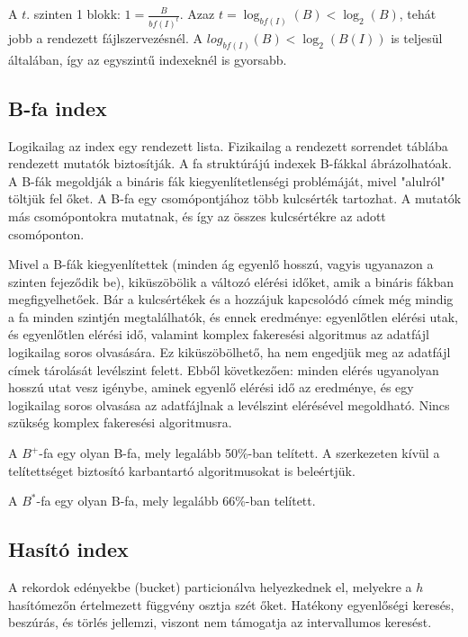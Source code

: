 \documentclass[margin=0px]{article}
\begin{document}
	A $t$. szinten 1 blokk: $1=\frac{B}{bf(I)^{t}}$. Azaz $t=\log_{bf(I)}(B) < \log_{2}(B) $, tehát jobb a rendezett fájlszervezésnél. A 
	$log_{bf(I)}(B) < \log_{2}(B(I)) $ is teljesül általában, így az egyszintű indexeknél is
	gyorsabb.
	
	\subsection{B-fa index}
	
	Logikailag az index egy rendezett lista. Fizikailag a rendezett sorrendet táblába rendezett mutatók 
	biztosítják. A fa struktúrájú indexek B-fákkal ábrázolhatóak. A B-fák megoldják a bináris fák 
	kiegyenlítetlenségi problémáját, mivel "alulról" töltjük fel őket. A B-fa egy csomópontjához több 
	kulcsérték tartozhat. A mutatók más csomópontokra mutatnak, és így az összes kulcsértékre az adott 
	csomóponton.
	
	Mivel a B-fák kiegyenlítettek (minden ág egyenlő hosszú, vagyis ugyanazon a szinten fejeződik be), 
	kiküszöbölik a változó elérési időket, amik a bináris fákban megfigyelhetőek. Bár a kulcsértékek és a 
	hozzájuk kapcsolódó címek még mindig a fa minden szintjén megtalálhatók, és ennek eredménye:
	egyenlőtlen elérési utak, és egyenlőtlen elérési idő, valamint komplex fakeresési algoritmus az 
	adatfájl logikailag soros olvasására. Ez kiküszöbölhető, ha nem engedjük meg az adatfájl címek 
	tárolását levélszint felett. Ebből következően: minden elérés ugyanolyan hosszú utat vesz igénybe, 
	aminek egyenlő elérési idő az eredménye, és egy logikailag soros olvasása az adatfájlnak a levélszint 
	elérésével megoldható. Nincs szükség komplex fakeresési algoritmusra.
	
	A $B^{+}$-fa egy olyan B-fa, mely legalább 50\%-ban telített. A szerkezeten kívül a telítettséget biztosító 
	karbantartó algoritmusokat is beleértjük.
	
	A $B^{*}$-fa egy olyan B-fa, mely legalább 66\%-ban telített.
	
	\subsection{Hasító index}
	
	A rekordok edényekbe (bucket) particionálva helyezkednek el, melyekre a $h$ hasítómezőn értelmezett
	függvény osztja szét őket. Hatékony egyenlőségi keresés, beszúrás, és törlés jellemzi, viszont nem támogatja
	az intervallumos keresést. 
	
\end{document}
